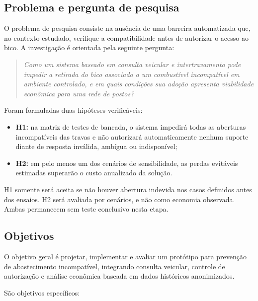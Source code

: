 \subsection{Problema e pergunta de pesquisa}

O problema de pesquisa consiste na ausência de uma barreira automatizada que,
no contexto estudado, verifique a compatibilidade antes de autorizar o acesso ao
bico. A investigação é orientada pela seguinte pergunta:

\begin{quote}
\textit{Como um sistema baseado em consulta veicular e intertravamento pode
impedir a retirada do bico associado a um combustível incompatível em ambiente
controlado, e em quais condições sua adoção apresenta viabilidade econômica
para uma rede de postos?}
\end{quote}

Foram formuladas duas hipóteses verificáveis:

\begin{itemize}
  \item \textbf{H1:} na matriz de testes de bancada, o sistema impedirá todas as
  aberturas incompatíveis das travas e não autorizará automaticamente nenhum
  suporte diante de resposta inválida, ambígua ou indisponível;
  \item \textbf{H2:} em pelo menos um dos cenários de sensibilidade, as perdas
  evitáveis estimadas superarão o custo anualizado da solução.
\end{itemize}

H1 somente será aceita se não houver abertura indevida nos casos definidos
antes dos ensaios. H2 será avaliada por cenários, e não como economia observada.
Ambas permanecem sem teste conclusivo nesta etapa.

\subsection{Objetivos}

O objetivo geral é projetar, implementar e avaliar um protótipo para prevenção
de abastecimento incompatível, integrando consulta veicular, controle de
autorização e análise econômica baseada em dados históricos anonimizados.

São objetivos específicos:

